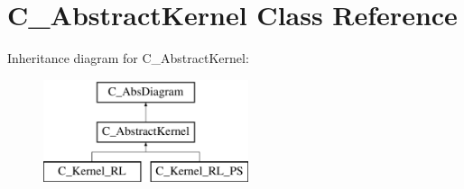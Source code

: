 \hypertarget{class_c___abstract_kernel}{\section{C\-\_\-\-Abstract\-Kernel Class Reference}
\label{class_c___abstract_kernel}
}
Inheritance diagram for C\-\_\-\-Abstract\-Kernel\-:\begin{figure}[H]
\begin{center}
\leavevmode
\includegraphics[height=3.000000cm]{class_c___abstract_kernel}
\end{center}
\end{figure}
